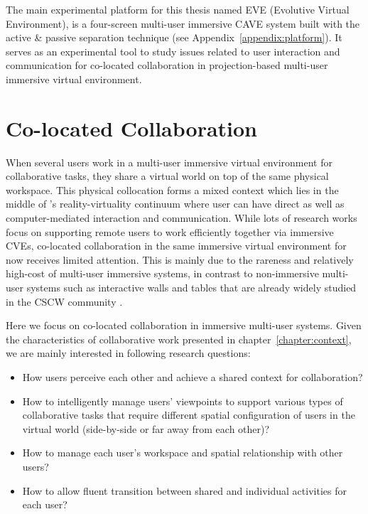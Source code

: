 The main experimental platform for this thesis named EVE (Evolutive Virtual Environment), is a four-screen multi-user immersive CAVE system built with the active \& passive separation technique (see Appendix~\ref{appendix:platform}). It serves as an experimental tool to study issues related to user interaction and communication for co-located collaboration in projection-based multi-user immersive virtual environment.



\section{Co-located Collaboration}
When several users work in a multi-user immersive virtual environment for collaborative tasks, they share a virtual world on top of the same physical workspace. This physical collocation forms a mixed context which lies in the middle of \citet{Milgram1995AR}'s reality-virtuality continuum where user can have direct as well as computer-mediated interaction and communication. While lots of research works focus on supporting remote users to work efficiently together via immersive CVEs, co-located collaboration in the same immersive virtual environment for now receives limited attention. This is mainly due to the rareness and relatively high-cost of multi-user immersive systems, in contrast to non-immersive multi-user systems such as interactive walls and tables that are already widely studied in the CSCW community \citep{Scott2003System, Inkpen2005Exploring}.

Here we focus on co-located collaboration in immersive multi-user systems. Given the characteristics of collaborative work presented in chapter~\ref{chapter:context}, we are mainly interested in following research questions:

\begin{itemize}
\item How users perceive each other and achieve a shared context for collaboration?
\item How to intelligently manage users' viewpoints to support various types of collaborative tasks that require different spatial configuration of users in the virtual world (side-by-side or far away from each other)?
\item How to manage each user's workspace and spatial relationship with other users?
\item How to allow fluent transition between shared and individual activities for each user?
\end{itemize}

